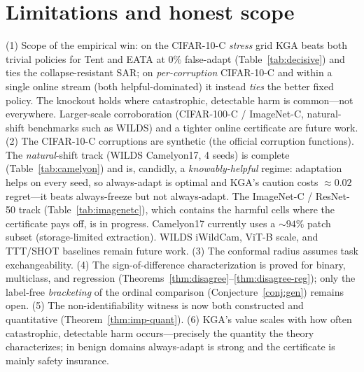 \documentclass[11pt]{article}
\theoremstyle{plain}
\theoremstyle{definition}
\begin{document}
\section{Limitations and honest scope}\label{sec:limits}
(1) Scope of the empirical win: on the CIFAR-10-C \emph{stress} grid \textsc{KGA} beats both
trivial policies for Tent and EATA at $0\%$ false-adapt (Table~\ref{tab:decisive}) and ties
the collapse-resistant SAR; on \emph{per-corruption} CIFAR-10-C and within a single online
stream (both helpful-dominated) it instead \emph{ties} the better fixed policy. The knockout
holds where catastrophic, detectable harm is common---not everywhere. Larger-scale
corroboration (CIFAR-100-C / ImageNet-C, natural-shift benchmarks such as WILDS) and a
tighter online certificate are future work.
(2) The CIFAR-10-C corruptions are synthetic (the official corruption functions). The
\emph{natural}-shift track (WILDS Camelyon17, 4 seeds) is complete
(Table~\ref{tab:camelyon}) and is, candidly, a \emph{knowably-helpful} regime: adaptation
helps on every seed, so always-adapt is optimal and \textsc{KGA}'s caution costs
$\approx\!0.02$ regret---it beats always-freeze but not always-adapt. The ImageNet-C /
ResNet-50 track (Table~\ref{tab:imagenetc}), which contains the harmful cells where the
certificate pays off, is in progress. Camelyon17 currently uses a $\sim\!94\%$ patch subset
(storage-limited extraction). WILDS iWildCam, ViT-B scale, and TTT/SHOT baselines remain
future work.
(3) The conformal radius assumes task exchangeability.
(4) The sign-of-difference characterization is proved for binary, multiclass, and
regression (Theorems~\ref{thm:disagree}--\ref{thm:disagree-reg}); only the label-free
\emph{bracketing} of the ordinal comparison (Conjecture~\ref{conj:gen}) remains open.
(5) The non-identifiability witness is now both constructed and quantitative
(Theorem~\ref{thm:imp-quant}).
(6) \textsc{KGA}'s value scales with how often catastrophic, detectable harm
occurs---precisely the quantity the theory characterizes; in benign domains
always-adapt is strong and the certificate is mainly safety insurance.
\end{document}
